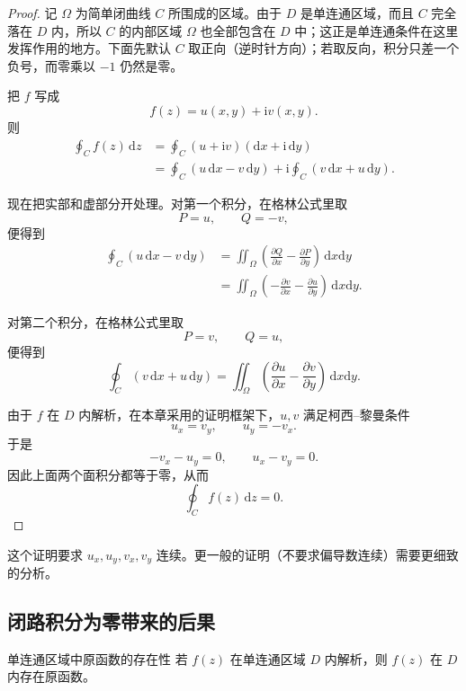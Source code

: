 \begin{proof}
记 $\Omega$ 为简单闭曲线 $C$ 所围成的区域。由于 $D$ 是单连通区域，而且 $C$ 完全落在 $D$ 内，所以 $C$ 的内部区域 $\Omega$ 也全部包含在 $D$ 中；这正是单连通条件在这里发挥作用的地方。下面先默认 $C$ 取正向（逆时针方向）；若取反向，积分只差一个负号，而零乘以 $-1$ 仍然是零。

把 $f$ 写成
\[
    f(z)=u(x,y)+\mathrm{i}v(x,y).
\]
则
\begin{align}
    \oint_C f(z)\,\mathrm{d}z
    &= \oint_C (u+\mathrm{i}v)(\mathrm{d}x+\mathrm{i}\,\mathrm{d}y) \\
    &= \oint_C (u\,\mathrm{d}x-v\,\mathrm{d}y)
    + \mathrm{i}\oint_C (v\,\mathrm{d}x+u\,\mathrm{d}y).
\end{align}

现在把实部和虚部分开处理。对第一个积分，在格林公式里取
\[
    P=u,\qquad Q=-v,
\]
便得到
\begin{align}
    \oint_C (u\,\mathrm{d}x-v\,\mathrm{d}y)
    &= \iint_{\Omega}\left(\frac{\partial Q}{\partial x}-\frac{\partial P}{\partial y}\right)\,\mathrm{d}x\mathrm{d}y \\
    &= \iint_{\Omega}\left(-\frac{\partial v}{\partial x}-\frac{\partial u}{\partial y}\right)\,\mathrm{d}x\mathrm{d}y.
\end{align}

对第二个积分，在格林公式里取
\[
    P=v,\qquad Q=u,
\]
便得到
\[
    \oint_C (v\,\mathrm{d}x+u\,\mathrm{d}y)
    = \iint_{\Omega}\left(\frac{\partial u}{\partial x}-\frac{\partial v}{\partial y}\right)\,\mathrm{d}x\mathrm{d}y.
\]

由于 $f$ 在 $D$ 内解析，在本章采用的证明框架下，$u,v$ 满足柯西--黎曼条件
\[
    u_x=v_y,\qquad u_y=-v_x.
\]
于是
\[
    -v_x-u_y=0,\qquad u_x-v_y=0.
\]
因此上面两个面积分都等于零，从而
\[
    \oint_C f(z)\,\mathrm{d}z = 0.
\]
\end{proof}

\begin{zhu}{}{}
这个证明要求 $u_x, u_y, v_x, v_y$ 连续。更一般的证明（不要求偏导数连续）需要更细致的分析。
\end{zhu}

\subsection{闭路积分为零带来的后果}

\begin{dingli}{单连通区域中原函数的存在性}{}
若 $f(z)$ 在单连通区域 $D$ 内解析，则 $f(z)$ 在 $D$ 内存在原函数。
\end{dingli}

